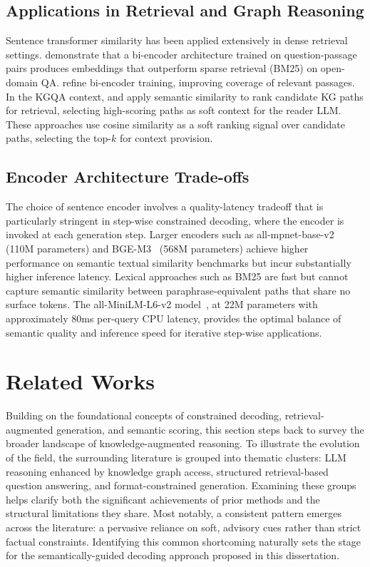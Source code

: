\subsection{Applications in Retrieval and Graph Reasoning}

Sentence transformer similarity has been applied extensively in dense retrieval settings. \citet{karpukhin2020dpr} demonstrate that a bi-encoder architecture trained on question-passage pairs produces embeddings that outperform sparse retrieval (BM25) on open-domain QA. \citet{xiong2020adore} refine bi-encoder training, improving coverage of relevant passages. In the KGQA context, \citet{shi2021kgpath} and \citet{saxena2022kgqa} apply semantic similarity to rank candidate KG paths for retrieval, selecting high-scoring paths as soft context for the reader LLM. These approaches use cosine similarity as a soft ranking signal over candidate paths, selecting the top-$k$ for context provision.

\subsection{Encoder Architecture Trade-offs}

The choice of sentence encoder involves a quality-latency tradeoff that is particularly stringent in step-wise constrained decoding, where the encoder is invoked at each generation step. Larger encoders such as all-mpnet-base-v2 (110M parameters) and BGE-M3~\citep{chen2024bge} (568M parameters) achieve higher performance on semantic textual similarity benchmarks but incur substantially higher inference latency. Lexical approaches such as BM25 are fast but cannot capture semantic similarity between paraphrase-equivalent paths that share no surface tokens. The all-MiniLM-L6-v2 model~\citep{reimers2019sbert}, at 22M parameters with approximately 80ms per-query CPU latency, provides the optimal balance of semantic quality and inference speed for iterative step-wise applications.

\section{Related Works}
\label{sec:related}

Building on the foundational concepts of constrained decoding, retrieval-augmented generation, and semantic scoring, this section steps back to survey the broader landscape of knowledge-augmented reasoning. To illustrate the evolution of the field, the surrounding literature is grouped into thematic clusters: LLM reasoning enhanced by knowledge graph access, structured retrieval-based question answering, and format-constrained generation. Examining these groups helps clarify both the significant achievements of prior methods and the structural limitations they share. Most notably, a consistent pattern emerges across the literature: a pervasive reliance on soft, advisory cues rather than strict factual constraints. Identifying this common shortcoming naturally sets the stage for the semantically-guided decoding approach proposed in this dissertation.

